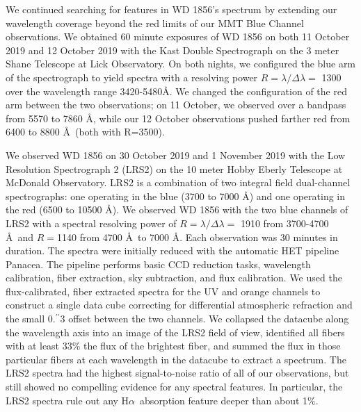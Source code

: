 \documentclass{nature3}
\newcommand{\farcs}{\mbox{\ensuremath{.\!\!^{\prime\prime}}}}%
\newcommand{\halpha}{H$\alpha$}
\begin{document}
\begin{methods}
We continued searching for features in WD 1856's spectrum by extending our wavelength coverage beyond the red limits of our MMT Blue Channel observations. We obtained 60 minute exposures of WD 1856 on both 11 October 2019 and 12 October 2019 with the Kast Double Spectrograph\cite{kast} on the 3 meter Shane Telescope at Lick Observatory. On both nights, we configured the blue arm of the spectrograph to yield spectra with a resolving power $R = \lambda/\Delta\lambda =$ 1300 over the wavelength range 3420-5480\AA. We changed the configuration of the red arm between the two observations; on 11 October, we observed over a bandpass from 5570 to 7860 \AA, while our 12 October observations pushed farther red from 6400 to 8800 \AA\ (both with R=3500). 

We observed WD 1856 on 30 October 2019 and 1 November 2019 with the Low Resolution Spectrograph 2 (LRS2\cite{chonis}) on the 10 meter Hobby Eberly Telescope at McDonald Observatory. LRS2 is a combination of two integral field dual-channel spectrographs: one operating in the blue (3700 to 7000 \AA) and one operating in the red (6500 to 10500 \AA). We observed WD 1856 with the two blue channels of LRS2 with a spectral resolving power of $R = \lambda/\Delta\lambda =$ 1910 from 3700-4700 \AA\ and $R=$1140 from 4700 \AA\ to 7000 \AA.  Each observation was 30 minutes in duration. The spectra were initially reduced with the automatic HET pipeline Panacea\cite{panaceawebpage}.  The pipeline performs basic CCD reduction tasks, wavelength calibration, fiber extraction, sky subtraction, and flux calibration.  We used the flux-calibrated, fiber extracted spectra for the UV and orange channels to construct a single data cube correcting for differential atmospheric refraction and the small 0\farcs3 offset between the two channels. We collapsed the datacube along the wavelength axis into an image of the LRS2 field of view, identified all fibers with at least 33\% the flux of the brightest fiber, and summed the flux in those particular fibers at each wavelength in the datacube to extract a spectrum. The LRS2 spectra had the highest signal-to-noise ratio of all of our observations, but still showed no compelling evidence for any spectral features. In particular, the LRS2 spectra rule out any \halpha\ absorption feature deeper than about 1\%. 


\end{methods}
\end{document}
